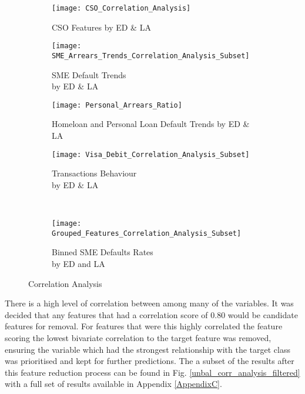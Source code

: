 \begin{figure}[H]
	\centering
 	\begin{subfigure}[b]{0.32\textwidth}
 		\captionsetup{font=scriptsize}
 		\texttt{[image: CSO\_Correlation\_Analysis]}
 		\caption{CSO Features by ED \& LA\\}
 		\label{fig:CSOCorrelation}
 	\end{subfigure}
	\begin{subfigure}[b]{0.32\textwidth}
		\captionsetup{font=scriptsize}
		\texttt{[image: SME\_Arrears\_Trends\_Correlation\_Analysis\_Subset]}
		\caption{SME Default Trends \\by ED \& LA}\label{fig:smeArrearsCorrelation}
	\end{subfigure} 
	\begin{subfigure}[b]{0.32\textwidth}
		\captionsetup{font=scriptsize}
		\texttt{[image: Personal\_Arrears\_Ratio]}
		\caption{Homeloan and Personal Loan Default Trends by ED \& LA}
		\label{fig:personalArrearsCorrelation}
	\end{subfigure} 
	\medskip
	\begin{subfigure}[b]{0.32\textwidth}
		\captionsetup{font=scriptsize}
		\texttt{[image: Visa\_Debit\_Correlation\_Analysis\_Subset]}
		\caption{Transactions Behaviour \\by ED \& LA }\label{fig:transVisaCorrelation}
	\end{subfigure} ~\quad
	\begin{subfigure}[b]{0.32\textwidth}
		\captionsetup{font=scriptsize}
		\texttt{[image: Grouped\_Features\_Correlation\_Analysis\_Subset]}
		\caption{Binned SME Defaults Rates \\by ED and LA\\}
		\label{fig:groupedFeaturesCorrelation}
	\end{subfigure}
	\caption{Correlation Analysis}
	\label{fig:unbal_corr_analysis}
\end{figure}

There is a high level of correlation between among many of the variables. It was decided that any features that had a correlation score of 0.80 would be candidate features for removal. For features that were this highly correlated the feature scoring the lowest bivariate correlation to the target feature was removed, ensuring the variable which had the strongest relationship with the target class was prioritised and kept for further predictions. The a subset of the results after this feature reduction process can be found in Fig. \ref{unbal_corr_analysis_filtered} with a full set of results available in Appendix \ref{AppendixC}. 

